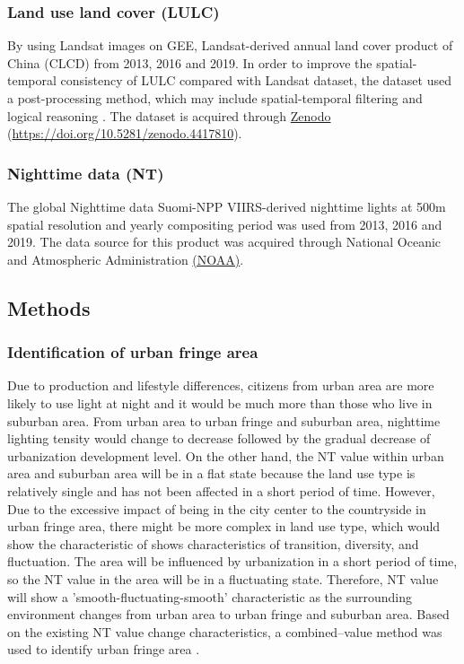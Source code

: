 \subsubsection{Land use land cover (LULC)}
By using Landsat images on GEE, Landsat-derived annual land cover product of China (CLCD) from 2013, 2016 and 2019. In order to improve the spatial-temporal consistency of LULC compared with Landsat dataset, the dataset used a post-processing method, which may include spatial-temporal filtering and logical reasoning \parencite{yang_30_2021}. The dataset is acquired through \href{https://doi.org/10.5281/zenodo.4417810}{Zenodo} (\url{https://doi.org/10.5281/zenodo.4417810}).\\

\subsubsection{Nighttime data (NT)}
The global Nighttime data Suomi-NPP VIIRS-derived nighttime lights at 500m spatial resolution and yearly compositing period was used from 2013, 2016 and 2019. The data source for this product was acquired through National Oceanic and Atmospheric Administration \href{https://github.com/Jackeytanlor/CASA_Dissertation/tree/main/dataset/NT}{(NOAA)}.\\

\subsection{Methods}
\subsubsection{Identification of urban fringe area}
Due to production and lifestyle differences, citizens from urban area are more likely to use light at night and it would be much more than those who live in suburban area. From urban area to urban fringe and suburban area, nighttime lighting tensity would change to decrease followed by the gradual decrease of urbanization development level. On the other hand, the NT value within urban area and suburban area will be in a flat state because the land use type is relatively single and has not been affected in a short period of time. However, Due to the excessive impact of being in the city center to the countryside in urban fringe area, there might be more complex in land use type, which would show the characteristic of shows characteristics of transition, diversity, and fluctuation. The area will be influenced by urbanization in a short period of time, so the NT value in the area will be in a fluctuating state. Therefore, NT value will show a 'smooth-fluctuating-smooth' characteristic as the surrounding environment changes from urban area to urban fringe and suburban area. Based on the existing NT value change characteristics, a combined–value method was used to identify urban fringe area \parencite{yang_spatial_2017}.\\


